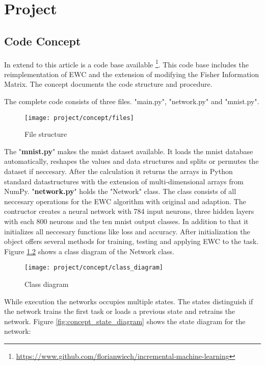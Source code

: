 \chapter{Project}

\section{Code Concept}

In extend to this article is a code base available \footnote{\url{https://www.github.com/florianwiech/incremental-machine-learning}}.
This code base includes the reimplementation of EWC and the extension of modifying the Fisher Information Matrix.
The concept documents the code structure and procedure.

The complete code consists of three files.
"main.py", "network.py" and "mnist.py".

\begin{figure}[H]
    \centering
    \texttt{[image: project/concept/files]}
    \caption{File structure}
    \label{fig:concept_file_structure}
\end{figure}

The "\textbf{mnist.py}" makes the mnist dataset available.
It loads the mnist database automatically, reshapes the values and data structures and splits or permutes the dataset if neccesary.
After the calculation it returns the arrays in Python standard datastructures with the extension of multi-dimensional arrays from NumPy.
\newline
"\textbf{network.py}" holds the "Network" class.
The class consists of all neccesary operations for the EWC algorithm with original and adaption.
The contructor creates a neural network with 784 input neurons, three hidden layers with each 800 neurons and the ten mnist output classes.
In addition to that it initializes all neccesary functions like loss and accuracy.
After initialization the object offers several methods for training, testing and applying EWC to the task.
Figure \ref{fig:concept_class_diagram} shows a class diagram of the Network class.

\begin{figure}[H]
    \centering
    \texttt{[image: project/concept/class\_diagram]}
    \caption{Class diagram}
    \label{fig:concept_class_diagram}
\end{figure}

While execution the networks occupies multiple states.
The states distinguish if the network trains the first task or loads a previous state and retrains the network.
Figure \ref{fig:concept_state_diagram} shows the state diagram for the network:

